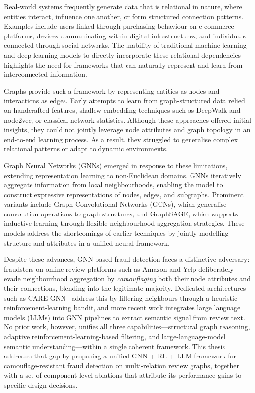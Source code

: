 Real-world systems frequently generate data that is relational in nature, where entities interact, influence one another, or form structured connection patterns. Examples include users linked through purchasing behaviour on e-commerce platforms, devices communicating within digital infrastructures, and individuals connected through social networks. The inability of traditional machine learning and deep learning models to directly incorporate these relational dependencies highlights the need for frameworks that can naturally represent and learn from interconnected information.

Graphs provide such a framework by representing entities as nodes and interactions as edges. Early attempts to learn from graph-structured data relied on handcrafted features, shallow embedding techniques such as DeepWalk and node2vec, or classical network statistics. Although these approaches offered initial insights, they could not jointly leverage node attributes and graph topology in an end-to-end learning process. As a result, they struggled to generalise complex relational patterns or adapt to dynamic environments.

Graph Neural Networks (GNNs) emerged in response to these limitations, extending representation learning to non-Euclidean domains. GNNs iteratively aggregate information from local neighbourhoods, enabling the model to construct expressive representations of nodes, edges, and subgraphs. Prominent variants include Graph Convolutional Networks (GCNs), which generalise convolution operations to graph structures, and GraphSAGE, which supports inductive learning through flexible neighbourhood aggregation strategies. These models address the shortcomings of earlier techniques by jointly modelling structure and attributes in a unified neural framework.

Despite these advances, GNN-based fraud detection faces a distinctive adversary: fraudsters on online review platforms such as Amazon and Yelp deliberately evade neighbourhood aggregation by \emph{camouflaging} both their node attributes and their connections, blending into the legitimate majority. Dedicated architectures such as CARE-GNN~\cite{dou2020enhancing} address this by filtering neighbours through a heuristic reinforcement-learning bandit, and more recent work integrates large language models (LLMs) into GNN pipelines to extract semantic signal from review text. No prior work, however, unifies all three capabilities---structural graph reasoning, adaptive reinforcement-learning-based filtering, and large-language-model semantic understanding---within a single coherent framework. This thesis addresses that gap by proposing a unified GNN + RL + LLM framework for camouflage-resistant fraud detection on multi-relation review graphs, together with a set of component-level ablations that attribute its performance gains to specific design decisions.

